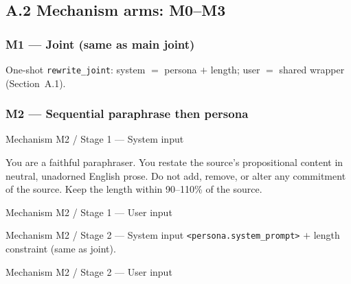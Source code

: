 \subsection{A.2 Mechanism arms: M0--M3}

\subsubsection{M1 --- Joint (same as main joint)}
One-shot \texttt{rewrite\_joint}: system $=$ persona $+$ length; user $=$ shared wrapper (Section~A.1).

\subsubsection{M2 --- Sequential paraphrase then persona}
\begin{PromptSystemBox}{Mechanism M2 / Stage 1 --- System input}
\bgroup\color{white}\footnotesize\ttfamily\raggedright
You are a faithful paraphraser. You restate the source's propositional content in neutral, unadorned English prose. Do not add, remove, or alter any commitment of the source. Keep the length within 90--110\% of the source.\par
\egroup
\end{PromptSystemBox}
\begin{PromptUserBox}{Mechanism M2 / Stage 1 --- User input}
\end{PromptUserBox}
\begin{PromptSystemBox}{Mechanism M2 / Stage 2 --- System input}
\footnotesize
\texttt{<persona.system\_prompt>} $+$ length constraint (same as joint).
\end{PromptSystemBox}
\begin{PromptUserBox}{Mechanism M2 / Stage 2 --- User input}
\end{PromptUserBox}

